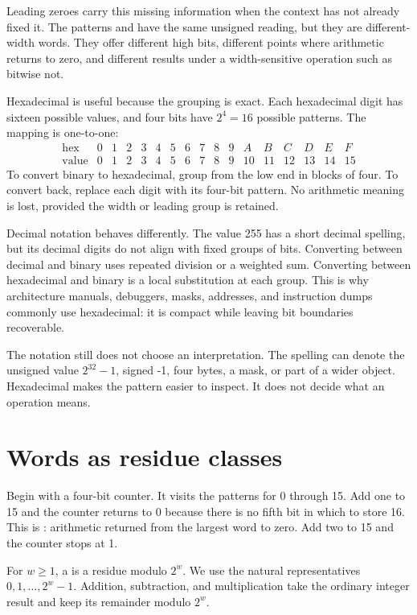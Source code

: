Leading zeroes carry this missing information when the context has not
already fixed it. The patterns  and  have the same
unsigned reading, but they are different-width words. They offer different
high bits, different points where arithmetic returns to zero, and different results under a
width-sensitive operation such as bitwise not.

Hexadecimal is useful because the grouping is exact. Each hexadecimal digit
has sixteen possible values, and four bits have \(2^4=16\) possible patterns.
The mapping is one-to-one:
\[
\begin{array}{c|cccccccccccccccc}
\mathrm{hex}&0&1&2&3&4&5&6&7&8&9&A&B&C&D&E&F\\
\hline
\mathrm{value}&0&1&2&3&4&5&6&7&8&9&10&11&12&13&14&15
\end{array}
\]
To convert binary to hexadecimal, group from the low end in blocks of four.
To convert back, replace each digit with its four-bit pattern. No arithmetic
meaning is lost, provided the width or leading group is retained.

Decimal notation behaves differently. The value 255 has a short decimal
spelling, but its decimal digits do not align with fixed groups of bits.
Converting between decimal and binary uses repeated division or a weighted
sum. Converting between hexadecimal and binary is a local substitution at
each group. This is why architecture manuals, debuggers, masks, addresses, and
instruction dumps commonly use hexadecimal: it is compact while leaving bit
boundaries recoverable.

The notation still does not choose an interpretation. The spelling
 can denote the unsigned value \(2^{32}-1\), signed -1, four
bytes, a mask, or part of a wider object. Hexadecimal makes the pattern easier
to inspect. It does not decide what an operation means.

\section{Words as residue classes}

Begin with a four-bit counter. It visits the patterns for 0 through 15. Add one
to 15 and the counter returns to 0 because there is no fifth bit in which to
store 16. This is : arithmetic returned from the largest
word to zero.
Add two to 15 and the counter stops at 1.

\begin{definition}[title={A0 word}]
For \(w \geq 1\), a  is a residue modulo
\(2^w\). We use the natural representatives
\(0,1,\ldots,2^w-1\). Addition, subtraction, and multiplication take the
ordinary integer result and keep its remainder modulo \(2^w\).
\end{definition}

